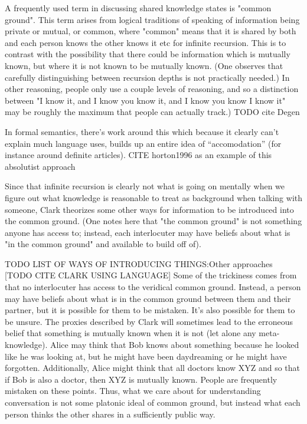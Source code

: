 \documentclass[]{article}
\begin{document}
A frequently used term in discussing shared knowledge states is "common ground". This term arises from logical traditions of speaking of information being private or mutual, or common, where "common" means that it is shared by both and each person knows the other knows it etc for infinite recursion. This is to contrast with the possibility that there could be information which is mutually known, but where it is not known to be mutually known. (One observes that carefully distinguishing between recursion depths is not practically needed.) In other reasoning, people only use a couple levels of reasoning, and so a distinction between "I know it, and I know you know it, and I know you know I know it" may be roughly the maximum that people can actually track.) TODO cite Degen

In formal semantics, there's work around this which because it clearly can't explain much language uses, builds up an entire idea of ``accomodation'' (for instance around definite articles). 
CITE horton1996 as an example of this absolutist approach

Since that infinite recursion is clearly not what is going on mentally when we figure out what knowledge is reasonable to treat as background when talking with someone, Clark theorizes some other ways for information to be introduced into the common ground. (One notes here that "the common ground" is not something anyone has access to; instead, each interlocuter may have beliefs about what is "in the common ground" and available to build off of). 

TODO LIST OF WAYS OF INTRODUCING THINGS:Other approaches [TODO CITE CLARK USING LANGUAGE] Some of the trickiness comes from that no interlocuter has access to the veridical common ground. Instead, a person may have beliefs about what is in the common ground between them and their partner, but it is possible for them to be mistaken. It's also possible for them to be unsure. The proxies described by Clark will sometimes lead to the erroneous belief that something is mutually known when it is not (let alone any meta-knowledge). Alice may think that Bob knows about something because he looked like he was looking at, but he might have been daydreaming or he might have forgotten. Additionally, Alice might think that all doctors know XYZ and so that if Bob is also a doctor, then XYZ is mutually known. People are frequently mistaken on these points. Thus, what we care about for understanding conversation is not some platonic ideal of common ground, but instead what each person thinks the other shares in a sufficiently public way. 
\end{document}

